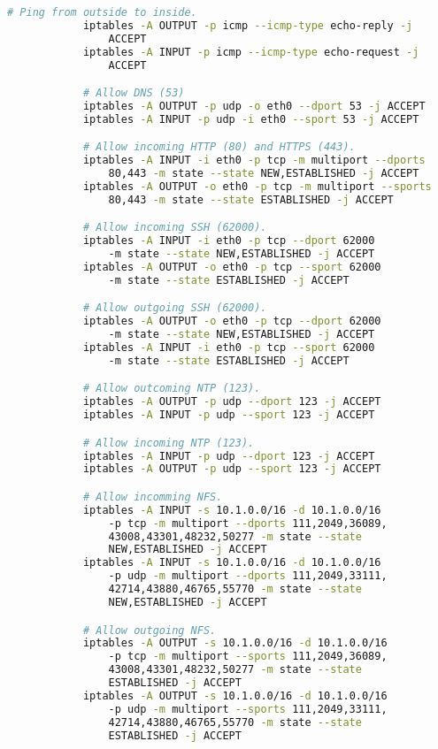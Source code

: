 \begin{itemize}
\begin{lstlisting}[language=bash]
            # Ping from outside to inside.
            iptables -A OUTPUT -p icmp --icmp-type echo-reply -j
                ACCEPT
            iptables -A INPUT -p icmp --icmp-type echo-request -j
                ACCEPT

            # Allow DNS (53)
            iptables -A OUTPUT -p udp -o eth0 --dport 53 -j ACCEPT
            iptables -A INPUT -p udp -i eth0 --sport 53 -j ACCEPT

            # Allow incoming HTTP (80) and HTTPS (443).
            iptables -A INPUT -i eth0 -p tcp -m multiport --dports
                80,443 -m state --state NEW,ESTABLISHED -j ACCEPT
            iptables -A OUTPUT -o eth0 -p tcp -m multiport --sports
                80,443 -m state --state ESTABLISHED -j ACCEPT

            # Allow incoming SSH (62000).
            iptables -A INPUT -i eth0 -p tcp --dport 62000
                -m state --state NEW,ESTABLISHED -j ACCEPT
            iptables -A OUTPUT -o eth0 -p tcp --sport 62000
                -m state --state ESTABLISHED -j ACCEPT

            # Allow outgoing SSH (62000).
            iptables -A OUTPUT -o eth0 -p tcp --dport 62000
                -m state --state NEW,ESTABLISHED -j ACCEPT
            iptables -A INPUT -i eth0 -p tcp --sport 62000
                -m state --state ESTABLISHED -j ACCEPT

            # Allow outcoming NTP (123).
            iptables -A OUTPUT -p udp --dport 123 -j ACCEPT
            iptables -A INPUT -p udp --sport 123 -j ACCEPT

            # Allow incoming NTP (123).
            iptables -A INPUT -p udp --dport 123 -j ACCEPT
            iptables -A OUTPUT -p udp --sport 123 -j ACCEPT

            # Allow incomming NFS.
            iptables -A INPUT -s 10.1.0.0/16 -d 10.1.0.0/16
                -p tcp -m multiport --dports 111,2049,36089,
                43008,43301,48232,50277 -m state --state
                NEW,ESTABLISHED -j ACCEPT
            iptables -A INPUT -s 10.1.0.0/16 -d 10.1.0.0/16
                -p udp -m multiport --dports 111,2049,33111,
                42714,43880,46765,55770 -m state --state
                NEW,ESTABLISHED -j ACCEPT

            # Allow outgoing NFS.
            iptables -A OUTPUT -s 10.1.0.0/16 -d 10.1.0.0/16
                -p tcp -m multiport --sports 111,2049,36089,
                43008,43301,48232,50277 -m state --state
                ESTABLISHED -j ACCEPT
            iptables -A OUTPUT -s 10.1.0.0/16 -d 10.1.0.0/16
                -p udp -m multiport --sports 111,2049,33111,
                42714,43880,46765,55770 -m state --state
                ESTABLISHED -j ACCEPT


\end{lstlisting}
\end{itemize}
